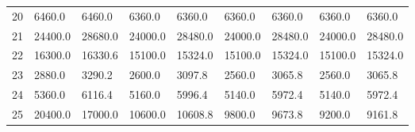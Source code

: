 \begin{tabular}{|r|l|l|l|l|l|l|l|l|}
  20 & 6460.0 & 6460.0 & 6360.0 & 6360.0 & 6360.0 & 6360.0 & 6360.0 & 6360.0 \\ 
  21 & 24400.0 & 28680.0 & 24000.0 & 28480.0 & 24000.0 & 28480.0 & 24000.0 & 28480.0 \\ 
  22 & 16300.0 & 16330.6 & 15100.0 & 15324.0 & 15100.0 & 15324.0 & 15100.0 & 15324.0 \\ 
  23 & 2880.0 & 3290.2 & 2600.0 & 3097.8 & 2560.0 & 3065.8 & 2560.0 & 3065.8 \\ 
  24 & 5360.0 & 6116.4 & 5160.0 & 5996.4 & 5140.0 & 5972.4 & 5140.0 & 5972.4 \\ 
  25 & 20400.0 & 17000.0 & 10600.0 & 10608.8 & 9800.0 & 9673.8 & 9200.0 & 9161.8 \\ 
\end{tabular}
